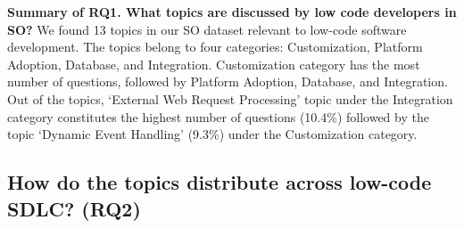 \begin{tcolorbox}[flushleft upper,boxrule=1pt,arc=0pt,left=0pt,right=0pt,top=0pt,bottom=0pt,colback=white,after=\ignorespacesafterend\par\noindent]
\noindent\textbf{Summary of RQ1. What topics are discussed by low code
developers in SO?} We found 13 topics in our SO dataset relevant to low-code
software development.  The topics belong to four categories: Customization,
Platform Adoption, Database, and Integration. Customization category has the
most number of questions, followed by Platform Adoption, Database, and
Integration. Out of the topics, `External Web Request Processing' topic under
the Integration category constitutes the highest number of questions (10.4\%)
followed by the topic `Dynamic Event Handling' (9.3\%) under the Customization
category.
\end{tcolorbox} 







\subsection{How do the topics distribute across low-code SDLC? (RQ2)}\label{sec:rq-topic-challenges}





